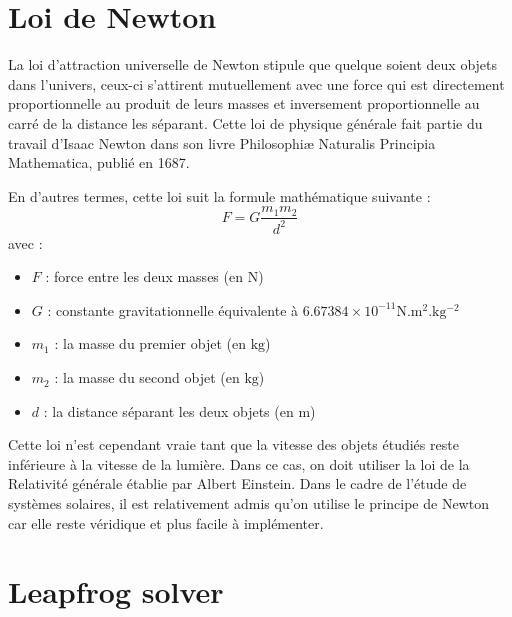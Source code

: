 \documentclass{article}
\begin{document}
\section*{Loi de Newton}

La loi d'attraction universelle de Newton stipule que quelque soient deux objets dans l'univers, ceux-ci s'attirent mutuellement avec une force qui est directement proportionnelle au produit de leurs masses et inversement proportionnelle au carré de la distance les séparant.
Cette loi de physique générale fait partie du travail d'Isaac Newton dans son livre Philosophiæ Naturalis Principia Mathematica, publié en 1687.

En d'autres termes, cette loi suit la formule mathématique suivante :
\[
F = G\frac{m_1m_2}{d^2}
\]
avec :
\begin{itemize}
\item $F$ : force entre les deux masses (en $\mathrm{N}$)
\item $G$ : constante gravitationnelle équivalente à $6.67384 \times 10^{-11} \mathrm{N.m^2.kg^{-2}}$
\item $m_1$ : la masse du premier objet (en $\mathrm{kg}$)
\item $m_2$ : la masse du second objet (en $\mathrm{kg}$)
\item $d$ : la distance séparant les deux objets (en $\mathrm{m}$)
\end{itemize}

Cette loi n'est cependant vraie tant que la vitesse des objets étudiés reste inférieure à la vitesse de la lumière. Dans ce cas, on doit utiliser la loi de la Relativité générale établie par Albert Einstein.
Dans le cadre de l'étude de systèmes solaires, il est relativement admis qu'on utilise le principe de Newton car elle reste véridique et plus facile à implémenter.

\section*{Leapfrog solver}
\end{document}
